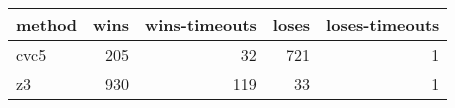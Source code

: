 \begin{tabular}{lrrrr}
\hline
 method   &   wins &   wins-timeouts &   loses &   loses-timeouts \\
\hline
 cvc5     &    205 &              32 &     721 &                1 \\
 z3       &    930 &             119 &      33 &                1 \\
\hline
\end{tabular}
